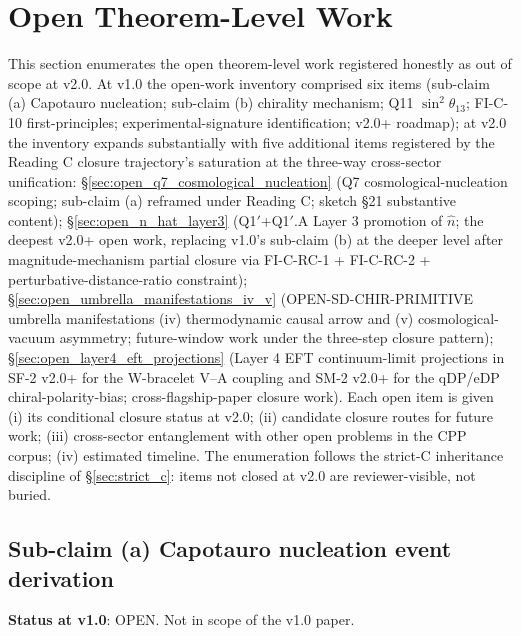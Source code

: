 \documentclass[11pt,letterpaper]{article}
\begin{document}
\section{Open Theorem-Level Work}\label{sec:open_work}

This section enumerates the open theorem-level work registered honestly as out of scope at v2.0. At v1.0 the open-work inventory comprised six items (sub-claim (a) Capotauro nucleation; sub-claim (b) chirality mechanism; Q11 $\sin^2\theta_{13}$; FI-C-10 first-principles; experimental-signature identification; v2.0+ roadmap); at v2.0 the inventory expands substantially with five additional items registered by the Reading C closure trajectory's saturation at the three-way cross-sector unification: \S\ref{sec:open_q7_cosmological_nucleation} (Q7 cosmological-nucleation scoping; sub-claim (a) reframed under Reading C; sketch \S21 substantive content); \S\ref{sec:open_n_hat_layer3} (Q1$'$+Q1$'$.A Layer 3 promotion of $\hat{n}$; the deepest v2.0+ open work, replacing v1.0's sub-claim (b) at the deeper level after magnitude-mechanism partial closure via FI-C-RC-1 + FI-C-RC-2 + perturbative-distance-ratio constraint); \S\ref{sec:open_umbrella_manifestations_iv_v} (OPEN-SD-CHIR-PRIMITIVE umbrella manifestations (iv) thermodynamic causal arrow and (v) cosmological-vacuum asymmetry; future-window work under the three-step closure pattern); \S\ref{sec:open_layer4_eft_projections} (Layer 4 EFT continuum-limit projections in SF-2 v2.0+ for the W-bracelet V--A coupling and SM-2 v2.0+ for the qDP/eDP chiral-polarity-bias; cross-flagship-paper closure work). Each open item is given (i) its conditional closure status at v2.0; (ii) candidate closure routes for future work; (iii) cross-sector entanglement with other open problems in the CPP corpus; (iv) estimated timeline. The enumeration follows the strict-C inheritance discipline of \S\ref{sec:strict_c}: items not closed at v2.0 are reviewer-visible, not buried.

\subsection{Sub-claim (a) Capotauro nucleation event derivation}\label{sec:open_subclaim_a}

\textbf{Status at v1.0}: OPEN. Not in scope of the v1.0 paper.
\end{document}
